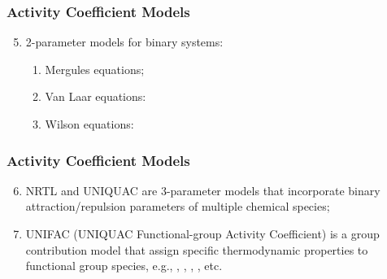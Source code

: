 \documentclass[10pt,compress,unknownkeysallowed]{beamer}
\begin{document}
\begin{frame}
  \frametitle{Activity Coefficient Models}
  \begin{enumerate}\setcounter{enumi}{4}
      \item<1-> 2-parameter models for binary systems:
        \begin{enumerate}
          \item<1-> Mergules equations;
          \item<2-> Van Laar equations:
          \item<3-> Wilson equations:
        \end{enumerate} 
  \end{enumerate}
\end{frame}
\normalsize


\begin{frame}
  \frametitle{Activity Coefficient Models}
  \begin{enumerate}\setcounter{enumi}{5}
      \item<1-> NRTL and UNIQUAC are 3-parameter models that incorporate binary attraction/repulsion parameters of multiple chemical species;
       \item<2-> UNIFAC (UNIQUAC Functional-group Activity Coefficient) is a group contribution model that assign specific thermodynamic properties to functional group species, e.g., , , , , etc.
  \end{enumerate}
\end{frame}
\normalsize
\end{document}
